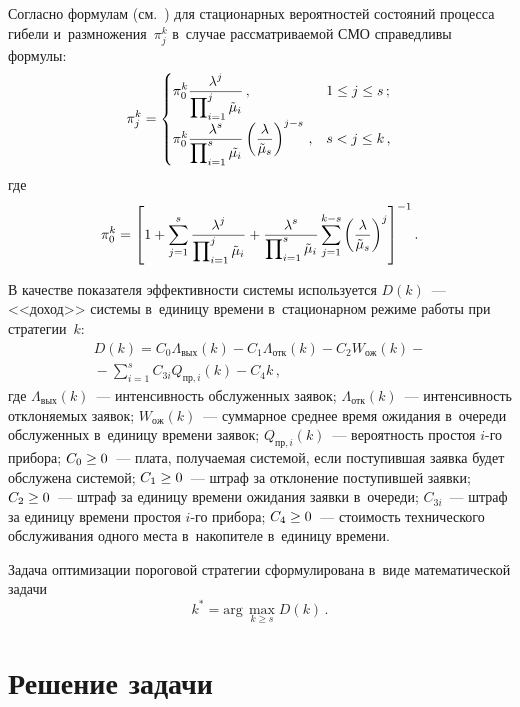 \begin{multicols}{2}
Согласно формулам (см.~\cite{14-ag}) для стационарных вероятностей
состояний процесса гибели и~размножения~$\pi_j^k$ в~случае
рассматриваемой СМО справедливы формулы:
\begin{equation}
\pi_j^k=\begin{cases}
\displaystyle \pi_0^k\displaystyle\frac{\displaystyle \lambda^j\mathstrut}{\displaystyle \prod\nolimits_{i=1}^j \tilde{\mu}_i\mathstrut}\,, &1\leq
j\leq s\,;\\[12pt]
\pi_0^k \displaystyle \displaystyle\frac{\displaystyle \lambda^s\mathstrut}{\displaystyle \prod\nolimits^s_{i=1}\tilde{\mu_i}\mathstrut}\left( \displaystyle\frac{\displaystyle \lambda\mathstrut}{\displaystyle \tilde{\mu}_s\mathstrut}\right)^{j-s}\,, &
s<j\leq k\,,
\end{cases}
\label{e1-ag}
\end{equation}
где
$$
\pi_0^k=\displaystyle \left[
1+\sum\limits^s_{j=1}\displaystyle\frac{\displaystyle \lambda^j\mathstrut}{\displaystyle \prod\nolimits^j_{i=1}\tilde{\mu}_i\mathstrut}+
\displaystyle\frac{\displaystyle \lambda^s\mathstrut}{\displaystyle \prod\nolimits^s_{i=1}\tilde{\mu}_i\mathstrut} \sum\limits_{j=1}^{k-s}\left(
\displaystyle\frac{\displaystyle \lambda\mathstrut}{\displaystyle \tilde{\mu}_s\mathstrut}\right)^j\right]^{-1}.
$$

В качестве показателя эффективности системы используется $D(k)$~---
<<доход>> системы в~единицу времени в~стационарном режиме работы при
стратегии~$k$:
\begin{multline}
D(k)={C}_0\Lambda_{\mathrm{вых}}(k)-
C_1\Lambda_{\mathrm{отк}}(k) - C_2 W_{\mathrm{ож}}(k)-{}\\
{}- \sum\limits^s_{i=1} C_{3i}Q_{\mathrm{пр},i}(k) -C_4k\,,
\label{e2-ag}
\end{multline}
где $\Lambda_{\mathrm{вых}}(k)$~--- интенсивность обслуженных заявок;
$\Lambda_{\mathrm{отк}}(k)$~--- интенсивность отклоняемых заявок;
$W_{\mathrm{ож}}(k)$~--- суммарное среднее время ожидания в~очереди
обслуженных в~единицу времени заявок; $Q_{\mathrm{пр},i}(k)$~---
вероятность простоя $i$-го прибора; $C_0\hm\geq 0$~--- плата,
получаемая системой, если поступившая заявка будет обслужена системой;
$C_1\hm\geq 0$~--- штраф за отклонение поступившей заявки;
$C_2\hm\geq 0$~---  штраф за единицу времени ожидания заявки
в~очереди; $C_{3i}$~--- штраф за единицу времени простоя $i$-го
прибора; $C_4\hm\geq 0$~--- стоимость технического обслуживания
одного места в~накопителе в~единицу времени.

Задача оптимизации пороговой стратегии сформулирована в~виде
математической задачи
\begin{equation}
k^*=\mathrm{arg}\,\max\limits_{k\geq s} D(k)\,.
\label{e3-ag}
\end{equation}

\section{Решение задачи}


\end{multicols}

